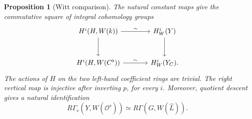 \documentclass[11pt]{article}
\numberwithin{equation}{section}
\newtheorem{proposition}[theorem]{Proposition}
\theoremstyle{definition}
\theoremstyle{remark}
\begin{document}
\begin{proposition}[Witt comparison]\label{prop:witt-comparison}
The natural constant maps give the commutative square of integral
cohomology groups
\begin{equation}\label{eq:witt-square}
\begin{tikzcd}[column sep=large,row sep=large]
 H^i(H,W(k)) \arrow[r,"\sim"] \arrow[d]
   & H_W^i(Y) \arrow[d]
   \\
 H^i(H,W(C^\flat)) \arrow[r,"\sim"]
   & H_W^i(Y_C).
\end{tikzcd}
\end{equation}
The actions of $H$ on the two left-hand coefficient rings are trivial.
The right vertical map is injective after inverting $p$, for every $i$.
Moreover, quotient descent gives a natural identification
\begin{equation}\label{eq:witt-group-identification}
 R\Gamma_v(Y,W(\mathcal O^\flat))
   \simeq R\Gamma(G,W(\widehat L)).
\end{equation}
\end{proposition}
\end{document}
